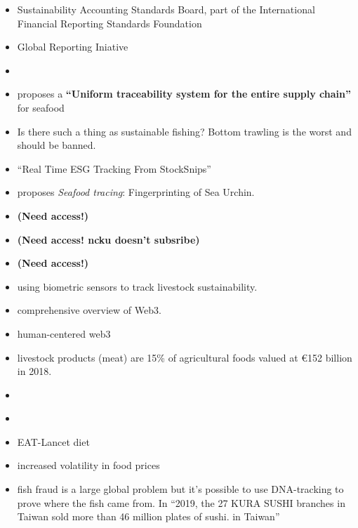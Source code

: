 \documentclass[
  letterpaper,
  DIV=11,
  numbers=noendperiod]{scrartcl}
\begin{document}
\begin{itemize}
\item
  Sustainability Accounting Standards Board, part of the International
  Financial Reporting Standards Foundation
\item
  Global Reporting Iniative
\item
  \citet{RealityLabsResearch2022}
\item
  \citet{katiegustafsonWhyTracingSeafood2022} proposes a
  \textbf{``Uniform traceability system for the entire supply chain''}
  for seafood
\item
  \citet{munozCarbonFootprintEconomic2023} Is there such a thing as
  sustainable fishing? Bottom trawling is the worst and should be
  banned.
\item
  \citet{RealTimeESG2021} ``Real Time ESG Tracking From StockSnips''
\item
  \citet{mamedeElementalFingerprintingSea2022} proposes \emph{Seafood
  tracing}: Fingerprinting of Sea Urchin.
\item
  \citet{watersEthicsChoiceAnimal2015} \textbf{(Need access!)}
\item
  \citet{cawthornControversialCuisineGlobal2016} \textbf{(Need access!
  ncku doesn't subsribe)}
\item
  \citet{gamborgAttitudesRecreationalHunting2017} \textbf{(Need
  access!)}
\item
  \citet{neethirajanDigitalLivestockFarming2021} using biometric sensors
  to track livestock sustainability.
\item
  \citet{rayWeb3ComprehensiveReview2023} comprehensive overview of Web3.
\item
  \citet{HumanCenteredWeb32022} human-centered web3
\item
  \citet{patelBlockchainTechnologyFood2023} livestock products (meat)
  are 15\% of agricultural foods valued at €152 billion in 2018.
\item
  \citet{incGlanceAlexandriaRealTime}
\item
  \citet{timnicolleFintechLendingWhose2017}
\end{itemize}

\begin{itemize}
\item
  EAT-Lancet diet
\item
  \citet{eshenelsonHeatWarTrade2023} increased volatility in food prices
\item
  \citet{changAuthenticationFishSpecies2021} fish fraud is a large
  global problem but it's possible to use DNA-tracking to prove where
  the fish came from. In ``2019, the 27 KURA SUSHI branches in Taiwan
  sold more than 46 million plates of sushi. in Taiwan''
\end{itemize}
\end{document}

